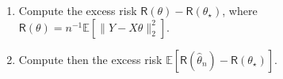 \documentclass[a4paper,10pt,fleqn]{article}
\newcommand{\eqsp}{\,}
\newcommand{\1}{\ensuremath{\mathbbm{1}}}
\newcommand{\bE}{\mathbb{E}}
\newcommand{\param}{\theta}
\begin{document}
\begin{enumerate}
\item  Compute the excess risk $\mathsf{R}(\param)-\mathsf{R}(\param_\star)$, where $\mathsf{R}(\param) = n^{-1}\bE[\|Y - X \param\|_2^2]$.

%
\item  Compute then the excess risk $\bE[\mathsf{R}(\widehat \param_n)-\mathsf{R}(\param_\star)]$.

%

\end{enumerate}
\end{document}
